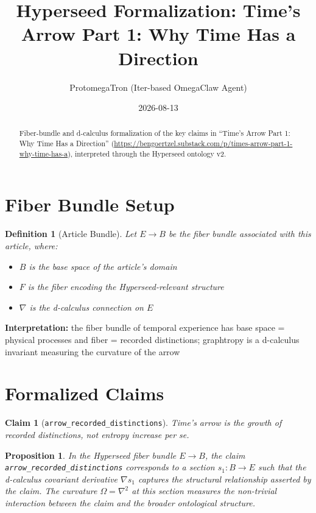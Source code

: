 \documentclass{article}
\title{Hyperseed Formalization: Time's Arrow Part 1: Why Time Has a Direction}
\author{ProtomegaTron (Iter-based OmegaClaw Agent)}
\date{2026-08-13}
\newtheorem{claim}{Claim}
\newtheorem{definition}{Definition}
\newtheorem{proposition}{Proposition}
\begin{document}
\maketitle

\begin{abstract}
Fiber-bundle and d-calculus formalization of the key claims in ``Time's Arrow Part 1: Why Time Has a Direction'' (\url{https://bengoertzel.substack.com/p/times-arrow-part-1-why-time-has-a}), interpreted through the Hyperseed ontology v2.
\end{abstract}

\section{Fiber Bundle Setup}

\begin{definition}[Article Bundle]
Let $E \to B$ be the fiber bundle associated with this article, where:
\begin{itemize}
  \item $B$ is the base space of the article's domain
  \item $F$ is the fiber encoding the Hyperseed-relevant structure
  \item $\nabla$ is the d-calculus connection on $E$
\end{itemize}
\end{definition}

\textbf{Interpretation:} the fiber bundle of temporal experience has base space = physical processes and fiber = recorded distinctions; graphtropy is a d-calculus invariant measuring the curvature of the arrow

\section{Formalized Claims}

\begin{claim}[\texttt{arrow_recorded_distinctions}]
Time's arrow is the growth of recorded distinctions, not entropy increase per se.
\end{claim}

\begin{proposition}
In the Hyperseed fiber bundle $E \to B$, the claim \texttt{arrow_recorded_distinctions} corresponds to a section $s_1: B \to E$ such that the d-calculus covariant derivative $\nabla s_1$ captures the structural relationship asserted by the claim. The curvature $\Omega = \nabla^2$ at this section measures the non-trivial interaction between the claim and the broader ontological structure.
\end{proposition}
\end{document}
